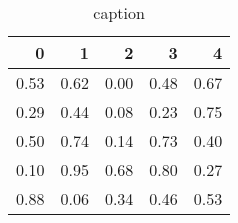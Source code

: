 \begin{table}
\caption{caption}
\label{label}
\begin{tabular}{rrrrr}
\toprule
0 & 1 & 2 & 3 & 4 \\
\midrule
0.53 & 0.62 & 0.00 & 0.48 & 0.67 \\
0.29 & 0.44 & 0.08 & 0.23 & 0.75 \\
0.50 & 0.74 & 0.14 & 0.73 & 0.40 \\
0.10 & 0.95 & 0.68 & 0.80 & 0.27 \\
0.88 & 0.06 & 0.34 & 0.46 & 0.53 \\
\bottomrule
\end{tabular}
\end{table}
